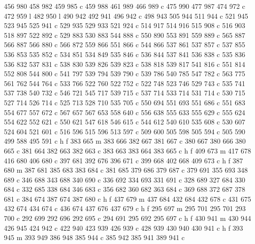 {{        456 980 458 982 459 985 c
        459 988 461 989 466 989 c
        475 990 477 987 474 972 c
        472 959 l
        482 950 l
        490 942 492 941 496 942 c
        498 943 505 944 511 944 c
        521 945 523 945 525 941 c
        529 935 529 933 521 924 c
        514 917 514 916 515 908 c
        516 903 518 897 522 892 c
        529 883 530 883 544 888 c
        550 890 553 891 559 889 c
        565 887 566 887 566 880 c
        566 872 559 866 551 866 c
        544 866 537 861 537 857 c
        537 855 536 853 535 852 c
        534 851 534 849 535 846 c
        536 844 537 841 536 838 c
        535 836 536 832 537 831 c
        538 830 539 826 539 823 c
        538 818 539 817 541 816 c
        551 814 552 808 544 800 c
        541 797 539 794 539 790 c
        539 786 540 785 547 782 c
        563 775 561 762 544 764 c
        533 766 522 760 522 752 c
        522 748 523 746 529 743 c
        535 741 537 738 540 732 c
        546 721 545 717 539 715 c
        537 714 533 714 531 714 c
        530 715 527 714 526 714 c
        525 713 528 710 535 705 c
        550 694 551 693 551 686 c
        551 683 554 677 557 672 c
        567 657 567 653 558 640 c
        556 638 555 633 555 629 c
        555 624 554 622 552 621 c
        550 621 547 618 546 615 c
        544 612 540 610 535 608 c
        530 607 524 604 521 601 c
        516 596 515 596 513 597 c
        509 600 505 598 505 594 c
        505 590 499 588 495 591 c
        h f
        383 665 m
        383 666 382 667 381 667 c
        380 667 380 666 380 665 c
        381 664 382 663 382 663 c
        383 663 383 664 383 665 c
        h f
        409 673 m
        417 678 416 680 406 680 c
        397 681 392 676 396 671 c
        399 668 402 668 409 673 c
        h f
        387 680 m
        387 681 385 683 383 684 c
        381 685 379 686 379 687 c
        379 691 355 693 348 689 c
        346 688 343 688 340 690 c
        336 692 334 693 331 691 c
        328 689 327 684 330 684 c
        332 685 338 684 346 683 c
        356 682 360 682 363 684 c
        369 688 372 687 378 681 c
        384 674 387 674 387 680 c
        h f
        437 679 m
        437 684 432 684 432 678 c
        431 675 432 674 434 674 c
        436 674 437 676 437 679 c
        h f
        295 697 m
        295 701 295 701 293 700 c
        292 699 292 696 292 695 c
        294 691 295 692 295 697 c
        h f
        430 941 m
        430 944 426 945 424 942 c
        422 940 423 939 426 939 c
        428 939 430 940 430 941 c
        h f
        393 945 m
        393 949 386 948 385 944 c
        385 942 385 941 389 941 c
}}
